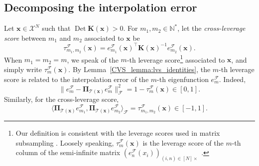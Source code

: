 \documentclass[twoside,11pt]{book}
\numberwithin{theorem}{chapter}
\numberwithin{definition}{chapter}
\numberwithin{proposition}{chapter}
\numberwithin{corollary}{chapter}
\numberwithin{example}{chapter}
\numberwithin{lemma}{chapter}
\numberwithin{assumption}{chapter}
\numberwithin{equation}{chapter}
\numberwithin{figure}{chapter}
\DeclareMathOperator{\Det}{Det}
\DeclareMathOperator{\Tran}{\intercal}
\DeclareMathOperator{\F}{\mathcal{F}}
\DeclareMathOperator{\Ns}{\mathbb{N}^{*}}
\newcommand{\rb}[1]{\textcolor{magenta}{#1}}
\begin{document}
\subsection{Decomposing the interpolation error}
\label{CVS_sec:decomposition_error}
Let $\bm{x} \in \mathcal{X}^{N}$ such that $\Det \bm{K}(\bm{x}) > 0$. For $m_{1}, m_{2} \in \mathbb{N}^{*}$, let the \emph{cross-leverage score} between $m_{1}$ and $m_{2}$ associated to $\bm{x}$ be
\begin{equation}\label{CVS_eq:cross_lvs_def}
\tau_{m_{1},m_{2}}^{\F}(\bm{x}) = e_{m_{1}}^{\F}(\bm{x})^{\Tran} \bm{K}(\bm{x})^{-1} e_{m_{2}}^{\F}(\bm{x}).
\end{equation}
When $m_1=m_2=m$, we speak of the $m$-th leverage score\footnote{Our definition is consistent with the leverage scores used in matrix subsampling  \parencite{DrMaMu06}. Loosely speaking, $\tau_{m}^{\F}(\bm{x})$ is the leverage score of the $m$-th column of the semi-infinite matrix  $(e_{n}^{\F}(x_{i}))_{(i,n) \in [N] \times \Ns}$.} associated to $\bm{x}$, and simply write $\tau_{m}^{\F}(\bm{x})$.
By Lemma~\ref{CVS_lemma:lvs_identities},
 the $m$-th leverage score is related to the interpolation error of the $m$-th eigenfunction $e_{m}^{\F}$. Indeed,
\begin{equation}
\|e_{m}^{\F} - \bm{\Pi}_{\mathcal{T}(\bm{x})} e_{m}^{\F}\|_{\F}^{2} = 1- \tau_{m}^{\F}(\bm{x}) \in [0,1].
\end{equation}
Similarly, for the cross-leverage score,
\begin{equation}
\langle \bm{\Pi}_{\mathcal{T}(\bm{x})} e_{m_{1}}^{\F}, \bm{\Pi}_{\mathcal{T}(\bm{x})} e_{m_{2}}^{\F} \rangle_{\F} = \tau_{m_{1},m_{2}}^{\F}(\bm{x}) \in [-1,1].
\end{equation}
\end{document}
